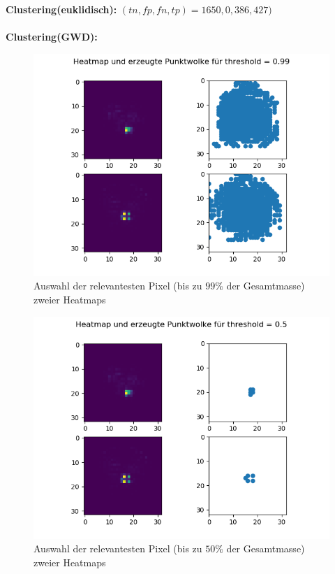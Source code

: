 \documentclass[twoside, 12pt,a4paper]{article}
\numberwithin{equation}{section}
\begin{document}
	\noindent \textbf{Clustering(euklidisch):}
	$(tn, fp, fn, tp) = 1650, 0, 386, 427)$\\
	\\
	\noindent \textbf{Clustering(GWD):}
	\begin{figure}[h]
		\begin{center}
			\includegraphics[width=0.5\textheight]{HeatmapPunktwolke99.png}
			\caption{Auswahl der relevantesten Pixel (bis zu $99\%$ der Gesamtmasse) zweier Heatmaps}
		\end{center}
	\end{figure}

\begin{figure}[h]
	\begin{center}
		\includegraphics[width=0.5\textheight]{HeatmapPunktwolke50.png}
		\caption{Auswahl der relevantesten Pixel (bis zu $50\%$ der Gesamtmasse) zweier Heatmaps}
	\end{center}
\end{figure}
\end{document}
